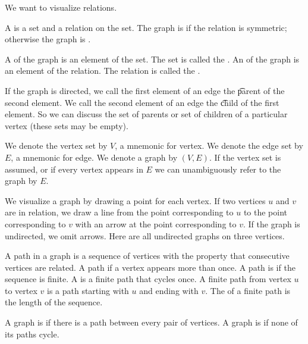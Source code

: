 

We want to visualize relations.


A  is a set and a relation
on the set.
The graph is 
if the relation is symmetric; otherwise the
graph is .

A  of the graph is an element
of the set.
The set is called the .
An  of the graph is an element of
the relation.
The relation is called the .

If the graph is directed, we call the first element of an edge the \t{parent} of the second element. We call the second element of an edge the \t{child} of the first element. So we can discuss the set of parents or set of children of a particular vertex (these sets may be empty).




We denote the vertex set by $V$, a mnemonic for
vertex.
We denote the edge set by $E$, a mnemonic for
edge.
We denote a graph by $(V, E)$.
If the vertex set is assumed, or if every vertex appears in $E$  we can unambiguously refer to the graph by $E$.



We visualize a graph by drawing a
point for each vertex.
If two vertices $u$ and $v$ are in relation,
we draw a line from the point corresponding
to $u$ to the point corresponding to $v$ with
an arrow at the point corresponding to $v$.
If the graph is undirected, we omit arrows.
Here are all undirected graphs on three
vertices.



A path in a graph is a sequence of
vertices with the property that
consecutive vertices are related.
A path  if a vertex
appears more than once.
A path is  if the
sequence is finite.
A  is a finite path
that cycles once.
A finite path from vertex $u$ to vertex $v$
is a path starting with $u$ and
ending with $v$.
The  of a finite path is
the length of the sequence.


A graph is 
if there is a path between every pair
of vertices. A graph is
 if none of its
paths cycle.
